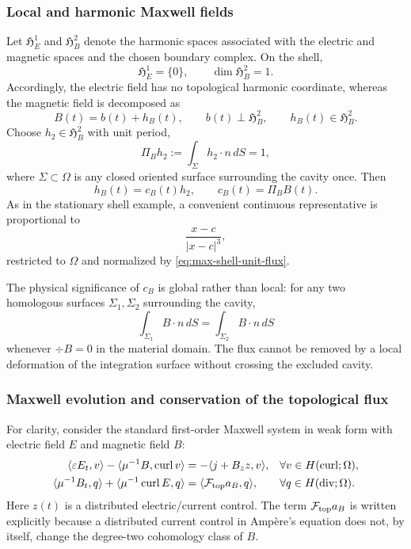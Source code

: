 \documentclass{article}
\DeclareMathOperator{\curl}{curl}
\DeclareMathOperator{\divergence}{div}
\newcommand{\ip}[2]{\langle #1,#2\rangle}
\begin{document}
\subsubsection{Local and harmonic Maxwell fields}

Let $\mathfrak H_E^1$ and $\mathfrak H_B^2$ denote the harmonic spaces
associated with the electric and magnetic spaces and the chosen
boundary complex.  On the shell,
\[
  \mathfrak H_E^1=\{0\},
  \qquad
  \dim\mathfrak H_B^2=1.
\]
Accordingly, the electric field has no topological harmonic coordinate,
whereas the magnetic field is decomposed as
\begin{equation}
  B(t)=b(t)+h_B(t),
  \qquad
  b(t)\perp\mathfrak H_B^2,
  \qquad
  h_B(t)\in\mathfrak H_B^2.
\end{equation}
Choose $h_2\in\mathfrak H_B^2$ with unit period,
\begin{equation}
  \Pi_B h_2
  :=
  \int_\Sigma h_2\cdot n\,dS
  =
  1,
  \label{eq:max-shell-unit-flux}
\end{equation}
where $\Sigma\subset\Omega$ is any closed oriented surface surrounding
the cavity once.  Then
\begin{equation}
  h_B(t)=c_B(t)h_2,
  \qquad
  c_B(t)=\Pi_B B(t).
\end{equation}
As in the stationary shell example, a convenient continuous
representative is proportional to
\[
  \frac{x-c}{|x-c|^3},
\]
restricted to $\Omega$ and normalized by
\eqref{eq:max-shell-unit-flux}.

The physical significance of $c_B$ is global rather than local:
for any two homologous surfaces $\Sigma_1,\Sigma_2$ surrounding the
cavity,
\[
  \int_{\Sigma_1}B\cdot n\,dS
  =
  \int_{\Sigma_2}B\cdot n\,dS
\]
whenever $\div B=0$ in the material domain.  The flux cannot be
removed by a local deformation of the integration surface without
crossing the excluded cavity.

\subsubsection{Maxwell evolution and conservation of the topological flux}

For clarity, consider the standard first-order Maxwell system in weak
form with electric field $E$ and magnetic field $B$:
\begin{subequations}
\begin{align}
  \ip{\varepsilon E_t}{v}
  -
  \ip{\mu^{-1}B}{\curl v}
  &=
  -\ip{j+B_z z}{v},
  && \forall v\in H(\curl;\Omega),
  \\
  \ip{\mu^{-1}B_t}{q}
  +
  \ip{\mu^{-1}\curl E}{q}
  &=
  \langle \mathcal F_{\rm top}a_B,q\rangle,
  && \forall q\in H(\divergence;\Omega).
  \label{eq:max-shell-faraday}
\end{align}
\end{subequations}
Here $z(t)$ is a distributed electric/current control.  The term
$\mathcal F_{\rm top}a_B$ is written explicitly because a distributed
current control in Amp\`ere's equation does not, by itself, change the
degree-two cohomology class of $B$.
\end{document}
